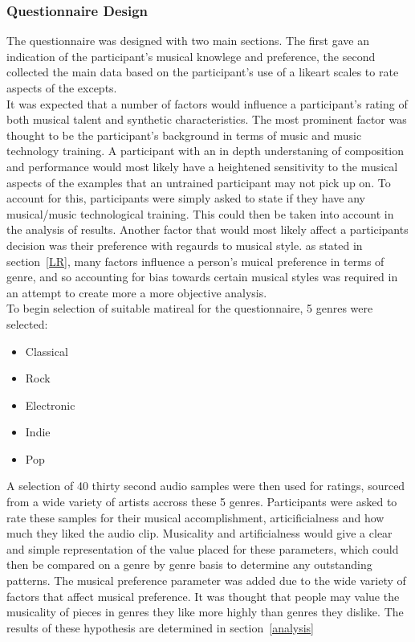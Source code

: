 \documentclass[titlepage]{scrartcl}
\begin{document}
    \subsubsection{Questionnaire Design}
    The questionnaire was designed with two main sections. The first gave an
    indication of the participant's musical knowlege and preference, the second
    collected the main data based on the participant's use of a likeart scales
    to rate aspects of the excepts.\\
    It was expected that a number of factors would influence a participant's
    rating of both musical talent and synthetic characteristics. The most
    prominent factor was thought to be the participant's background in terms of
    music and music technology training. A participant with an in depth
    understaning of composition and performance would most likely have a
    heightened sensitivity to the musical aspects of the examples that an
    untrained participant may not pick up on. To account for this, participants
    were simply asked to state if they have any musical/music technological
    training. This could then be taken into account in the analysis of results.
    Another factor that would most likely affect a participants decision was
    their preference with regaurds to musical style. as stated in
    section~\ref{LR}, many factors influence a person's muical preference in
    terms of genre, and so accounting for bias towards certain musical styles
    was required in an attempt to create more a more objective analysis.\\

    To begin selection of suitable matireal for the questionnaire, 5 genres were selected:
    \begin{itemize}
        \item Classical
        \item Rock
        \item Electronic
        \item Indie
        \item Pop
    \end{itemize}
    A selection of 40 thirty second audio samples were then used for ratings,
    sourced from a wide variety of artists accross these 5 genres.
    Participants were asked to rate these samples for their musical
    accomplishment, articificialness and how much they liked the audio clip.
    Musicality and artificialness would give a clear and simple representation
    of the value placed for these parameters, which could then be compared on a
    genre by genre basis to determine any outstanding patterns. The musical
    preference parameter was added due to the wide variety of factors that
    affect musical preference. It was thought that people may value the
    musicality of pieces in genres they like more highly than genres they
    dislike. The results of these hypothesis are determined in section~\ref{analysis}\\
    
\end{document}
